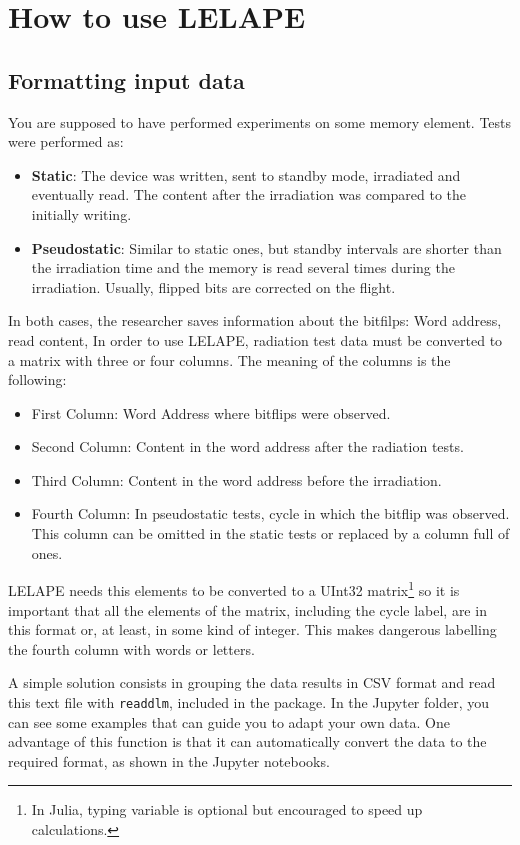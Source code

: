 \chapter{How to use LELAPE}
\section{Formatting input data}
%
You are supposed to have performed experiments on some memory element. Tests were performed as:
\begin{itemize}
	\item \textbf{Static}: The device was written, sent to standby mode, irradiated and eventually read. The content after the irradiation was compared to the initially writing.
	\item \textbf{Pseudostatic}: Similar to static ones, but standby intervals are shorter than the irradiation time and the memory is read several times during the irradiation. Usually, flipped bits are corrected on the flight.
\end{itemize}

In both cases, the researcher saves information about the bitfilps: Word address, read content, 
In order to use LELAPE, radiation test data must be converted to a matrix with three or four columns. The meaning of the columns is the following:
\begin{itemize}
	\item First Column: Word Address where bitflips were observed.
	\item Second Column: Content in the word address after the radiation tests.
	\item Third Column: Content in the word address before the irradiation.
	\item Fourth Column: In pseudostatic tests, cycle in which the bitflip was observed. This column can be omitted in the static tests or replaced by a column full of ones. 
\end{itemize} 

LELAPE needs this elements to be converted to a UInt32 matrix\footnote{In Julia, typing variable is optional but encouraged to speed up calculations.} so it is important that all the elements of the matrix, including the cycle label, are in this format or, at least, in some kind of integer. This makes dangerous labelling the fourth column with words or letters. 

A simple solution consists in grouping the data results in CSV format and read this text file with \texttt{readdlm}, included in the  package. In the Jupyter folder, you can see some examples that can guide you to adapt your own data. One advantage of this function is that it can automatically convert the data to the required format, as shown in the Jupyter notebooks.

